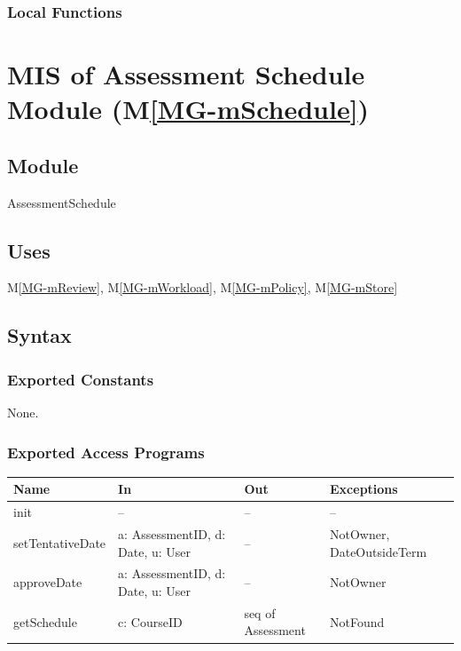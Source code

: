 \documentclass[12pt, titlepage]{article}
\newcommand{\mref}[1]{M\ref{MG-#1}}
\begin{document}

\subsubsection{Local Functions}


\newpage

\section{MIS of Assessment Schedule Module (\mref{mSchedule})} \label{mis-mSchedule}

\subsection{Module}

AssessmentSchedule

\subsection{Uses}

\mref{mReview}, \mref{mWorkload}, \mref{mPolicy}, \mref{mStore}

\subsection{Syntax}

\subsubsection{Exported Constants}

None.

\subsubsection{Exported Access Programs}

\begin{center}\small
\begin{tabular}{>{\raggedright\arraybackslash}p{3.3cm} >{\raggedright\arraybackslash}p{4.1cm} >{\raggedright\arraybackslash}p{3.4cm} >{\raggedright\arraybackslash}p{4.0cm}}
\hline
\textbf{Name} & \textbf{In} & \textbf{Out} & \textbf{Exceptions} \\
\hline
init & -- & -- & -- \\
setTentativeDate & a: AssessmentID, d: Date, u: User & -- & NotOwner, DateOutsideTerm \\
approveDate & a: AssessmentID, d: Date, u: User & -- & NotOwner \\
getSchedule & c: CourseID & seq of Assessment & NotFound \\
\hline
\end{tabular}
\end{center}
\end{document}
